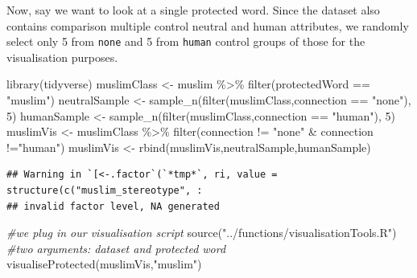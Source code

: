 \documentclass[
  12pt,
]{book}
\newenvironment{Shaded}{\begin{snugshade}}{\end{snugshade}}
\newcommand{\CommentTok}[1]{\textcolor[rgb]{0.56,0.35,0.01}{\textit{#1}}}
\newcommand{\DecValTok}[1]{\textcolor[rgb]{0.00,0.00,0.81}{#1}}
\newcommand{\FunctionTok}[1]{\textcolor[rgb]{0.00,0.00,0.00}{#1}}
\newcommand{\NormalTok}[1]{#1}
\newcommand{\OtherTok}[1]{\textcolor[rgb]{0.56,0.35,0.01}{#1}}
\newcommand{\SpecialCharTok}[1]{\textcolor[rgb]{0.00,0.00,0.00}{#1}}
\newcommand{\StringTok}[1]{\textcolor[rgb]{0.31,0.60,0.02}{#1}}
\begin{document}
Now, say we want to look at a single protected word. Since the dataset also contains comparison multiple control neutral and human attributes, we randomly select only 5 from \texttt{none} and 5 from \texttt{human} control groups of those for the visualisation purposes.

\vspace{1mm}
\footnotesize

\begin{Shaded}
\begin{Highlighting}[]
\FunctionTok{library}\NormalTok{(tidyverse)}
\NormalTok{muslimClass }\OtherTok{\textless{}{-}}\NormalTok{ muslim }\SpecialCharTok{\%\textgreater{}\%} \FunctionTok{filter}\NormalTok{(protectedWord }\SpecialCharTok{==} \StringTok{"muslim"}\NormalTok{)}
\NormalTok{neutralSample }\OtherTok{\textless{}{-}} \FunctionTok{sample\_n}\NormalTok{(}\FunctionTok{filter}\NormalTok{(muslimClass,connection }\SpecialCharTok{==} \StringTok{"none"}\NormalTok{), }\DecValTok{5}\NormalTok{)}
\NormalTok{humanSample }\OtherTok{\textless{}{-}} \FunctionTok{sample\_n}\NormalTok{(}\FunctionTok{filter}\NormalTok{(muslimClass,connection }\SpecialCharTok{==} \StringTok{"human"}\NormalTok{), }\DecValTok{5}\NormalTok{)}
\NormalTok{muslimVis }\OtherTok{\textless{}{-}}\NormalTok{ muslimClass }\SpecialCharTok{\%\textgreater{}\%} \FunctionTok{filter}\NormalTok{(connection }\SpecialCharTok{!=} \StringTok{"none"} \SpecialCharTok{\&}\NormalTok{ connection }\SpecialCharTok{!=}\StringTok{"human"}\NormalTok{)}
\NormalTok{muslimVis }\OtherTok{\textless{}{-}} \FunctionTok{rbind}\NormalTok{(muslimVis,neutralSample,humanSample)}
\end{Highlighting}
\end{Shaded}

\begin{verbatim}
## Warning in `[<-.factor`(`*tmp*`, ri, value = structure(c("muslim_stereotype", :
## invalid factor level, NA generated
\end{verbatim}

\begin{Shaded}
\begin{Highlighting}[]
\CommentTok{\#we plug in our visualisation script}
\FunctionTok{source}\NormalTok{(}\StringTok{"../functions/visualisationTools.R"}\NormalTok{)}
\CommentTok{\#two arguments: dataset and protected word}
\FunctionTok{visualiseProtected}\NormalTok{(muslimVis,}\StringTok{"muslim"}\NormalTok{)}
\end{Highlighting}
\end{Shaded}
\end{document}

